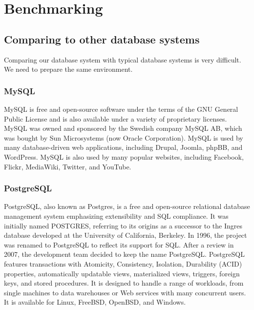 \chapter{Benchmarking}

\section{Comparing to other database systems}
Comparing our database system with typical database systems is very difficult. We need to prepare the same environment.

\subsection{MySQL}
MySQL is free and open-source software under the terms of the GNU General Public License and is also available under a variety of proprietary licenses. MySQL was owned and sponsored by the Swedish company MySQL AB, which was bought by Sun Microsystems (now Oracle Corporation). MySQL is used by many database-driven web applications, including Drupal, Joomla, phpBB, and WordPress. MySQL is also used by many popular websites, including Facebook, Flickr, MediaWiki, Twitter, and YouTube.

\subsection{PostgreSQL}
PostgreSQL, also known as Postgres, is a free and open-source relational database management system emphasizing extensibility and SQL compliance. It was initially named POSTGRES, referring to its origins as a successor to the Ingres database developed at the University of California, Berkeley. In 1996, the project was renamed to PostgreSQL to reflect its support for SQL. After a review in 2007, the development team decided to keep the name PostgreSQL. PostgreSQL features transactions with Atomicity, Consistency, Isolation, Durability (ACID) properties, automatically updatable views, materialized views, triggers, foreign keys, and stored procedures. It is designed to handle a range of workloads, from single machines to data warehouses or Web services with many concurrent users. It is available for Linux, FreeBSD, OpenBSD, and Windows.

